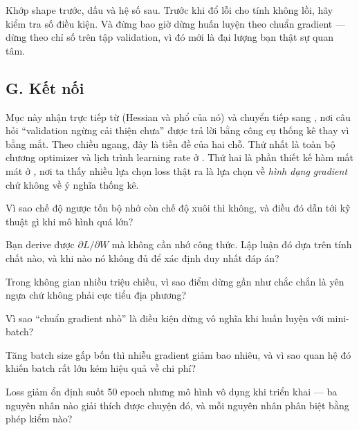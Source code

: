 \documentclass[../../../deep_learning.tex]{subfiles}
\begin{document}
\begin{cannho}
Khớp shape trước, dấu và hệ số sau. Trước khi đổ lỗi cho tính không lồi, hãy kiểm tra số điều kiện. Và đừng bao giờ dừng huấn luyện theo chuẩn gradient --- dừng theo chỉ số trên tập validation, vì đó mới là đại lượng bạn thật sự quan tâm. 
\end{cannho}

\subsection{G. Kết nối}
Mục này nhận trực tiếp từ  (Hessian và phổ của nó) và chuyển tiếp sang , nơi câu hỏi ``validation ngừng cải thiện chưa'' được trả lời bằng công cụ thống kê thay vì bằng mắt. Theo chiều ngang, đây là tiền đề của hai chỗ. Thứ nhất là toàn bộ chương optimizer và lịch trình learning rate ở . Thứ hai là phần thiết kế hàm mất mát ở , nơi ta thấy nhiều lựa chọn loss thật ra là lựa chọn về \emph{hình dạng gradient} chứ không về ý nghĩa thống kê.

\begin{tukiem}
\item Vì sao chế độ ngược tốn bộ nhớ còn chế độ xuôi thì không, và điều đó dẫn tới kỹ thuật gì khi mô hình quá lớn?
\item Bạn derive được \(\partial L/\partial W\) mà không cần nhớ công thức. Lập luận đó dựa trên tính chất nào, và khi nào nó không đủ để xác định duy nhất đáp án?
\item Trong không gian nhiều triệu chiều, vì sao điểm dừng gần như chắc chắn là yên ngựa chứ không phải cực tiểu địa phương?
\item Vì sao ``chuẩn gradient nhỏ'' là điều kiện dừng vô nghĩa khi huấn luyện với mini-batch?
\item Tăng batch size gấp bốn thì nhiễu gradient giảm bao nhiêu, và vì sao quan hệ đó khiến batch rất lớn kém hiệu quả về chi phí?
\item Loss giảm ổn định suốt 50 epoch nhưng mô hình vô dụng khi triển khai --- ba nguyên nhân nào giải thích được chuyện đó, và mỗi nguyên nhân phân biệt bằng phép kiểm nào?
\end{tukiem}
\ifSubfilesClassLoaded{\printbibliography[title={Nguồn}]}{}
\end{document}
